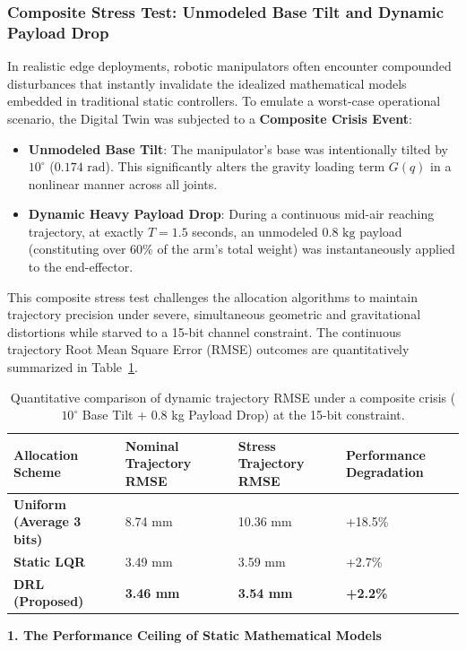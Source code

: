 \subsubsection{Composite Stress Test: Unmodeled Base Tilt and Dynamic Payload Drop}
In realistic edge deployments, robotic manipulators often encounter compounded disturbances that instantly invalidate the idealized 
mathematical models embedded in traditional static controllers. To emulate a worst-case operational scenario, the Digital Twin was subjected to a \textbf{Composite Crisis Event}:
\begin{itemize}
    \item \textbf{Unmodeled Base Tilt}: The manipulator's base was intentionally tilted by $10^\circ$ ($0.174 \text{ rad}$). This significantly alters the gravity loading term $G(q)$ in a nonlinear manner across all joints.
    \item \textbf{Dynamic Heavy Payload Drop}: During a continuous mid-air reaching trajectory, at exactly $T=1.5$ seconds, an unmodeled $0.8 \text{ kg}$ payload (constituting over 60\% of the arm's total weight) was instantaneously applied to the end-effector.
\end{itemize}
This composite stress test challenges the allocation algorithms to maintain trajectory precision under severe, simultaneous geometric and 
gravitational distortions while starved to a 15-bit channel constraint. The continuous trajectory Root Mean Square Error (RMSE) outcomes are quantitatively 
summarized in Table~\ref{tab:rmse_crisis}.
\begin{table}[H]
  \centering
  \footnotesize
  \renewcommand{\arraystretch}{1.8} %
  \caption{Quantitative comparison of dynamic trajectory RMSE under a composite crisis ($10^\circ$ Base Tilt + 0.8 kg Payload Drop) at the 15-bit constraint.}
  \label{tab:rmse_crisis}
  \begin{tabular}{llll}
    \toprule
    Allocation Scheme & Nominal Trajectory RMSE & Stress Trajectory RMSE & Performance Degradation \\
    \midrule
    \textbf{Uniform (Average 3 bits)} & 8.74 mm          & 10.36 mm         & +18.5\% \\
    \textbf{Static LQR}               & 3.49 mm          & 3.59 mm          & +2.7\%  \\
    \textbf{DRL (Proposed)}           & \textbf{3.46 mm} & \textbf{3.54 mm} & \textbf{+2.2\%} \\
    \bottomrule
  \end{tabular}
\end{table}
\noindent\textbf{1. The Performance Ceiling of Static Mathematical Models}

